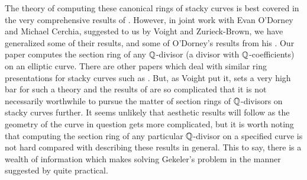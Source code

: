\documentclass[12pt]{amsart}
\begin{document}
	The theory of computing these canonical rings of stacky curves is best covered in the very comprehensive results of \cite{VZB}. However, in joint work with Evan O'Dorney and Michael Cerchia, suggested to us by Voight and Zurieck-Brown, we have generalized some of their results, and some of O'Dorney's results from his \cite{ODorney-canonical-rings-Q-divisors-on-P1}. Our paper \cite{Cerchia-Franklin-ODorney-Qdiv-Ell-curves} computes the section ring of any $\mathbb{ Q }$-divisor (a divisor with $\mathbb{ Q }$-coefficients) on an elliptic curve. There are other papers which deal with similar ring presentations for stacky curves such as \cite{Landesman-Ruhm-Zhang-Spin-canonical-rings}. But, as Voight put it, \cite{VZB} sets a very high bar for such a theory and the results of \cite{Cerchia-Franklin-ODorney-Qdiv-Ell-curves} are so complicated that it is not necessarily worthwhile to pursue the matter of section rings of $\mathbb{ Q }$-divisors on stacky curves further. It seems unlikely that aesthetic results will follow as the geometry of the curve in question gets more complicated, but it is worth noting that computing the section ring of any particular $\mathbb{ Q }$-divisor on a specified curve is not hard compared with describing these results in general. This to say, there is a wealth of information which makes solving Gekeler's problem in the manner suggested by \cite{Franklin-geometry-Drinfeld-modular-forms} quite practical.\\
	
\end{document}

